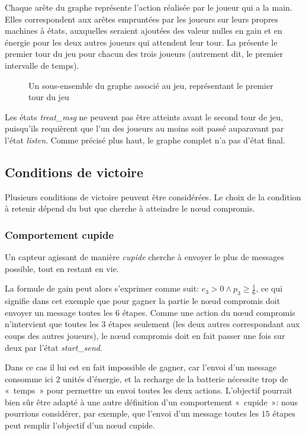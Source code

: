 Chaque arête du graphe représente l'action réalisée par le joueur qui a la main.
Elles correspondent aux arêtes empruntées par les joueurs sur leurs propres machines à états, auxquelles seraient ajoutées des valeur nulles en gain et en énergie pour les deux autres joueurs qui attendent leur tour.
La  présente le premier tour du jeu pour chacun des trois joueurs (autrement dit, le premier intervalle de temps).
\begin{figure*}[p]
    \centering
    
    \caption{Un sous-ensemble du graphe associé au jeu, représentant le premier tour du jeu}\label{tj:fig:autFirstTurn}
\end{figure*}
Les états \emph{treat\_msg} ne peuvent pas être atteints avant le second tour de jeu, puisqu'ils requièrent que l'un des joueurs au moins soit passé auparavant par l'état \emph{listen}.
Comme précisé plus haut, le graphe complet n'a pas d'état final.

    \subsection{Conditions de victoire}

Plusieurs conditions de victoire peuvent être considérées.
Le choix de la condition à retenir dépend du but que cherche à atteindre le nœud compromis.

        \subsubsection{Comportement cupide}
Un capteur agissant de manière \emph{cupide} cherche à envoyer le plus de messages possible, tout en restant en vie.

La formule de gain peut alors s'exprimer comme suit: $e_3 > 0 \wedge p_3 \geq \frac16$, ce qui signifie dans cet exemple que pour gagner la partie le nœud compromis doit envoyer un message toutes les $6$ étapes.
Comme une action du nœud compromis n'intervient que toutes les $3$ étapes seulement (les deux autres correspondant aux coups des autres joueurs), le nœud compromis doit en fait passer une fois sur deux par l'état \emph{start\_send}.

Dans ce cas il lui est en fait impossible de gagner, car l'envoi d'un message consomme ici $2$ unités d'énergie, et la recharge de la batterie nécessite trop de « temps » pour permettre un envoi toutes les deux actions.
L'objectif pourrait bien sûr être adapté à une autre définition d'un comportement « cupide »: nous pourrions considérer, par exemple, que l'envoi d'un message toutes les $15$ étapes peut remplir l'objectif d'un nœud cupide.

